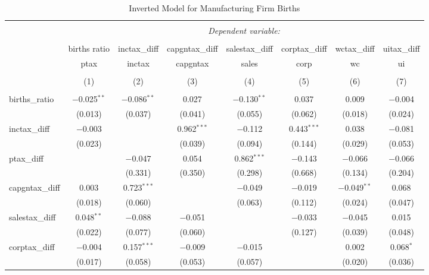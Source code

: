 
\begin{table}[!htbp] \centering 
  \caption{Inverted Model for  Manufacturing Firm Births} 
  \label{31-33rd} 
\footnotesize 
\begin{tabular}{@{\extracolsep{5pt}}lccccccc} 
\\[-1.8ex]\hline 
\hline \\[-1.8ex] 
 & \multicolumn{7}{c}{\textit{Dependent variable:}} \\ 
\cline{2-8} 
\\[-1.8ex] & births ratio & inctax\_diff & capgntax\_diff & salestax\_diff & corptax\_diff & wctax\_diff & uitax\_diff \\ 
 & ptax & inctax & capgntax & sales & corp & wc & ui \\ 
\\[-1.8ex] & (1) & (2) & (3) & (4) & (5) & (6) & (7)\\ 
\hline \\[-1.8ex] 
 births\_ratio & $-$0.025$^{**}$ & $-$0.086$^{**}$ & 0.027 & $-$0.130$^{**}$ & 0.037 & 0.009 & $-$0.004 \\ 
  & (0.013) & (0.037) & (0.041) & (0.055) & (0.062) & (0.018) & (0.024) \\ 
  inctax\_diff & $-$0.003 &  & 0.962$^{***}$ & $-$0.112 & 0.443$^{***}$ & 0.038 & $-$0.081 \\ 
  & (0.023) &  & (0.039) & (0.094) & (0.144) & (0.029) & (0.053) \\ 
  ptax\_diff &  & $-$0.047 & 0.054 & 0.862$^{***}$ & $-$0.143 & $-$0.066 & $-$0.066 \\ 
  &  & (0.331) & (0.350) & (0.298) & (0.668) & (0.134) & (0.204) \\ 
  capgntax\_diff & 0.003 & 0.723$^{***}$ &  & $-$0.049 & $-$0.019 & $-$0.049$^{**}$ & 0.068 \\ 
  & (0.018) & (0.060) &  & (0.063) & (0.112) & (0.024) & (0.047) \\ 
  salestax\_diff & 0.048$^{**}$ & $-$0.088 & $-$0.051 &  & $-$0.033 & $-$0.045 & 0.015 \\ 
  & (0.022) & (0.077) & (0.060) &  & (0.127) & (0.039) & (0.048) \\ 
  corptax\_diff & $-$0.004 & 0.157$^{***}$ & $-$0.009 & $-$0.015 &  & 0.002 & 0.068$^{*}$ \\ 
  & (0.017) & (0.058) & (0.053) & (0.057) &  & (0.020) & (0.036) \\ 

\end{tabular}
\end{table}
